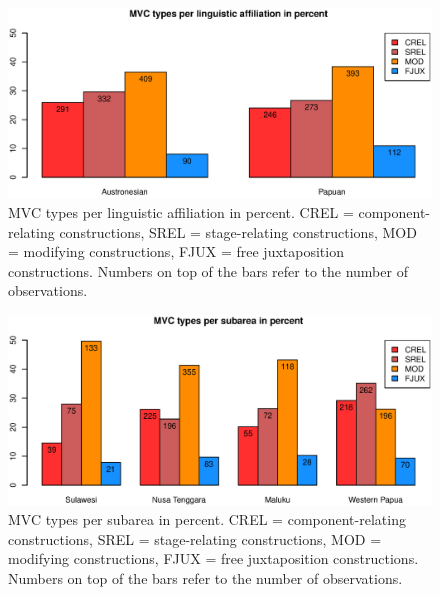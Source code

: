 \begin{figure}
\includegraphics[width=\columnwidth]{figures/Type_Family.eps}
\caption[MVC types per linguistic affiliation in percent]{MVC types per linguistic affiliation in percent. CREL = component-relating constructions, SREL = stage-relating constructions, MOD = modifying constructions, FJUX = free juxtaposition constructions. Numbers on top of the bars refer to the number of observations.}\label{fig:type-family}
\end{figure}
\begin{figure}
\includegraphics[width=\columnwidth]{figures/Type_Group.eps}
\caption[MVC types per subarea in percent]{MVC types per subarea in percent. CREL = component-relating constructions, SREL = stage-relating constructions, MOD = modifying constructions, FJUX = free juxtaposition constructions. Numbers on top of the bars refer to the number of observations.}\label{fig:type-group6}
\end{figure}

